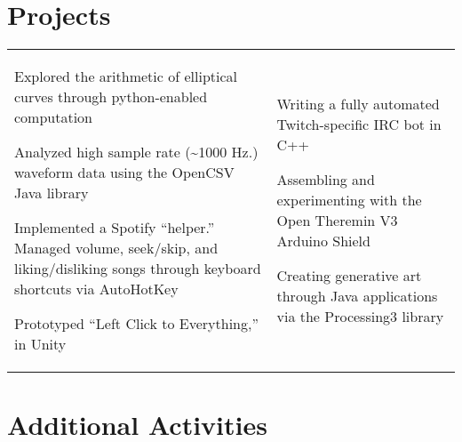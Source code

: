 \documentclass[10.5pt, letterpaper]{article}
\begin{document}

\vspace{-30pt}
\section*{Projects}
\vspace{-8pt}

\begin{center}
	\begin{tabularx}{\textwidth}[t]{X X}
		
		\begin{description}
			\item [Prior Projects] 
				Explored the arithmetic of elliptical curves through python-enabled computation
			\item Analyzed high sample rate (\~{}1000 Hz.) waveform data using the OpenCSV Java library
			\item Implemented a Spotify ``helper.'' Managed volume, seek/skip, and liking/disliking songs through keyboard shortcuts via AutoHotKey
			\item Prototyped ``Left Click to Everything,'' in Unity
		\end{description}
		&
		
		\begin{description}
			\item [Current Projects] 
				Writing a fully automated Twitch-specific IRC bot in C++
			\item Assembling and experimenting with the Open Theremin V3 Arduino Shield
			\item Creating generative art through Java applications via the Processing3 library
		\end{description}
	\end{tabularx}
\end{center}

\vspace{-24pt}
\section*{Additional Activities}
\vspace{-18pt}
\end{document}
